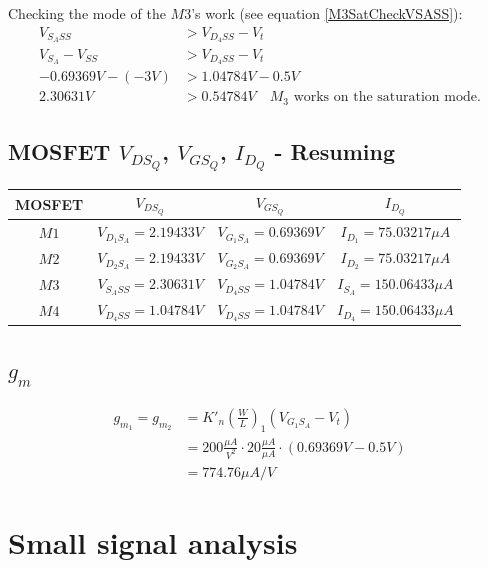 Checking the mode of the $M3$'s work (see equation \ref{M3SatCheckVSASS}):
\begin{align}
V_{{S_A}SS} &> V_{{D_4}SS} - V_t\\
V_{S_A} - V_{SS} &> V_{{D_4}SS} - V_t\\
-0.69369V - (-3V) &> 1.04784V - 0.5V\\
2.30631V &> 0.54784V \quad M_3\text{ works on the saturation mode.}
\end{align}

\subsection{MOSFET $V_{DS_Q}$, $V_{GS_Q}$, $I_{D_Q}$ - Resuming}
\begin{center}
\begin{tabular}{|c|c|c|c|}
\hline
MOSFET & $V_{DS_Q}$ & $V_{GS_Q}$ & $I_{D_Q}$ \\
\hline
$M1$ & $V_{D_1S_A} = 2.19433V$ & $V_{G_1S_A} = 0.69369V$ & $I_{D_1} = 75.03217\mu A$ \\
\hline
$M2$ & $V_{D_2S_A} = 2.19433V$ & $V_{G_2S_A} = 0.69369V$ & $I_{D_2} = 75.03217\mu A$ \\
\hline
$M3$ & $V_{S_ASS} = 2.30631V$ & $V_{D_4SS} = 1.04784V$ & $I_{S_A} = 150.06433 \mu A$ \\
\hline
$M4$ & $V_{D_4SS} = 1.04784V$ & $V_{D_4SS} = 1.04784V$ & $I_{D_4} = 150.06433 \mu A$ \\
\hline
\end{tabular}
\end{center}

\subsection{$g_m$}
\begin{align}
g_{m_1} = g_{m_2} &= K'_n \left(\frac{W}{L}\right)_1 (V_{G_1S_A} - V_t)\\
&= 200 \frac{\mu A}{V^2} \cdot 20 \frac{\mu A}{\mu A} \cdot (0.69369V-0.5V)\\
&= 774.76 \mu A/V
\end{align}

\section{Small signal analysis}
